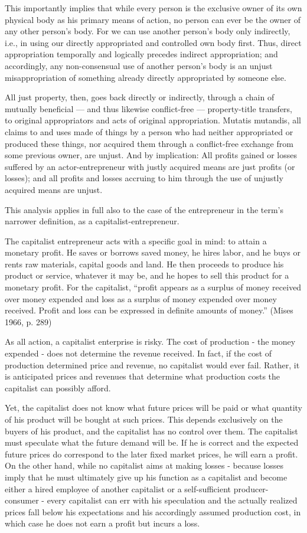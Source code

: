 This importantly implies that while every person is the exclusive owner of its own physical body as his primary means of action, no person can ever be the owner of any other person’s body. For we can use another person’s body only indirectly, i.e., in using our directly appropriated and controlled own body first. Thus, direct appropriation temporally and logically precedes indirect appropriation; and accordingly, any non-consensual use of another person’s body is an unjust misappropriation of something already directly appropriated by someone else.

All just property, then, goes back directly or indirectly, through a chain of mutually beneficial — and thus likewise conflict-free — property-title transfers, to original appropriators and acts of original appropriation. Mutatis mutandis, all claims to and uses made of things by a person who had neither appropriated or produced these things, nor acquired them through a conflict-free exchange from some previous owner, are unjust. And by implication: All profits gained or losses suffered by an actor-entrepreneur with justly acquired means are just profits (or losses); and all profits and losses accruing to him through the use of unjustly acquired means are unjust.

This analysis applies in full also to the case of the entrepreneur in the term’s narrower definition, as a capitalist-entrepreneur.

The capitalist entrepreneur acts with a specific goal in mind: to attain a monetary profit. He saves or borrows saved money, he hires labor, and he buys or rents raw materials, capital goods and land. He then proceeds to produce his product or service, whatever it may be, and he hopes to sell this product for a monetary profit. For the capitalist, ``profit appears as a surplus of money received over money expended and loss as a surplus of money expended over money received. Profit and loss can be expressed in definite amounts of money.'' (Mises 1966, p. 289)

As all action, a capitalist enterprise is risky. The cost of production - the money expended - does not determine the revenue received. In fact, if the cost of production determined price and revenue, no capitalist would ever fail. Rather, it is anticipated prices and revenues that determine what production costs the capitalist can possibly afford.

Yet, the capitalist does not know what future prices will be paid or what quantity of his product will be bought at such prices. This depends exclusively on the buyers of his product, and the capitalist has no control over them. The capitalist must speculate what the future demand will be. If he is correct and the expected future prices do correspond to the later fixed market prices, he will earn a profit. On the other hand, while no capitalist aims at making losses - because losses imply that he must ultimately give up his function as a capitalist and become either a hired employee of another capitalist or a self-sufficient producer-consumer - every capitalist can err with his speculation and the actually realized prices fall below his expectations and his accordingly assumed production cost, in which case he does not earn a profit but incurs a loss.


